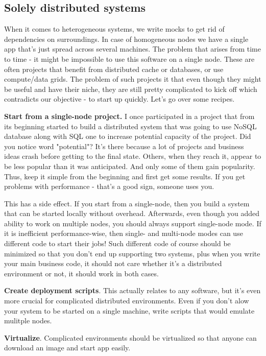 \subsection{Solely distributed systems}
When it comes to heterogeneous systems, we write mocks to get rid of dependencies on surroundings. In case of homogeneous nodes we have a single app that's just spread across several machines. The problem that arises from time to time - it might be impossible to use this software on a single node. These are often projects that benefit from distributed cache or databases, or use compute/data grids. The problem of such projects it that even though they might be useful and have their niche, they are still pretty complicated to kick off which contradicts our objective - to start up quickly. Let's go over some recipes.

\textbf{Start from a single-node project.} I once participated in a project that from its beginning started to build a distributed system that was going to use NoSQL database along with SQL one to increase potential capacity of the project. Did you notice word "potential"? It's there because a lot of projects and business ideas crash before getting to the final state. Others, when they reach it, appear to be less popular than it was anticipated. And only some of them gain popularity. Thus, keep it simple from the beginning and first get some results. If you get problems with performance - that's a good sign, someone uses you.

This has a side effect. If you start from a single-node, then you build a system that can be started locally without overhead. Afterwards, even though you added ability to work on multiple nodes, you should always support single-node mode. If it is inefficient performance-wise, then single- and multi-node modes can use different code to start their jobs! Such different code of course should be minimized so that you don't end up supporting two systems, plus when you write your main business code, it should not care whether it's a distributed environment or not, it should work in both cases.

\textbf{Create deployment scripts}. This actually relates to any software, but it's even more crucial for complicated distributed environments. Even if you don't alow your system to be started on a single machine, write scripts that would emulate mulitple nodes.

\textbf{Virtualize}. Complicated environments should be virtualized so that anyone can download an image and start app easily.
